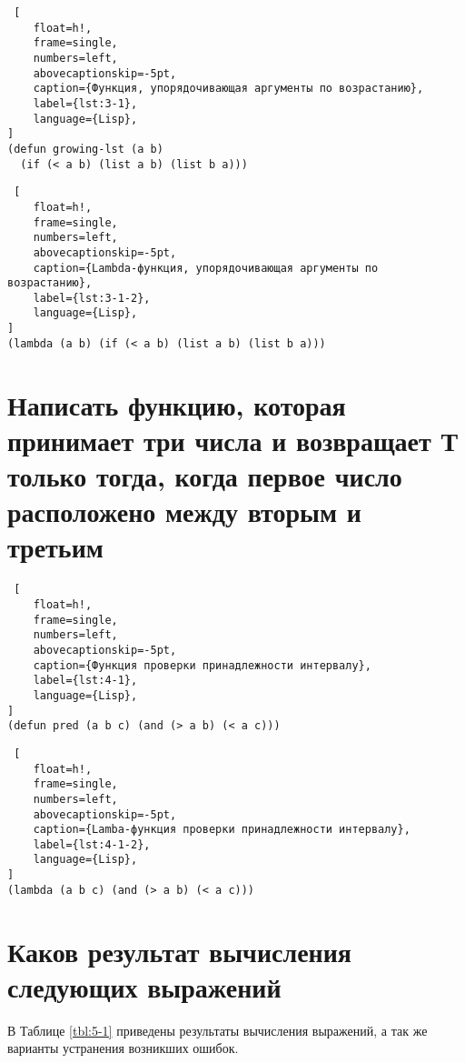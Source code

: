 \begin{lstlisting} [
	float=h!,
	frame=single,
	numbers=left,
	abovecaptionskip=-5pt,
	caption={Функция, упорядочивающая аргументы по возрастанию},
	label={lst:3-1},
	language={Lisp},
]
(defun growing-lst (a b)
  (if (< a b) (list a b) (list b a)))
\end{lstlisting}

\begin{lstlisting} [
	float=h!,
	frame=single,
	numbers=left,
	abovecaptionskip=-5pt,
	caption={Lambda-функция, упорядочивающая аргументы по возрастанию},
	label={lst:3-1-2},
	language={Lisp},
]
(lambda (a b) (if (< a b) (list a b) (list b a)))
\end{lstlisting}

\section{Написать функцию, которая принимает три числа и возвращает Т только тогда, когда первое число расположено между вторым и третьим}

\begin{lstlisting} [
	float=h!,
	frame=single,
	numbers=left,
	abovecaptionskip=-5pt,
	caption={Функция проверки принадлежности интервалу},
	label={lst:4-1},
	language={Lisp},
]
(defun pred (a b c) (and (> a b) (< a c)))
\end{lstlisting}

\begin{lstlisting} [
	float=h!,
	frame=single,
	numbers=left,
	abovecaptionskip=-5pt,
	caption={Lamba-функция проверки принадлежности интервалу},
	label={lst:4-1-2},
	language={Lisp},
]
(lambda (a b c) (and (> a b) (< a c)))
\end{lstlisting}

\section{Каков результат вычисления следующих выражений}

В Таблице \ref{tbl:5-1} приведены результаты вычисления выражений, а так же варианты устранения возникших ошибок.

